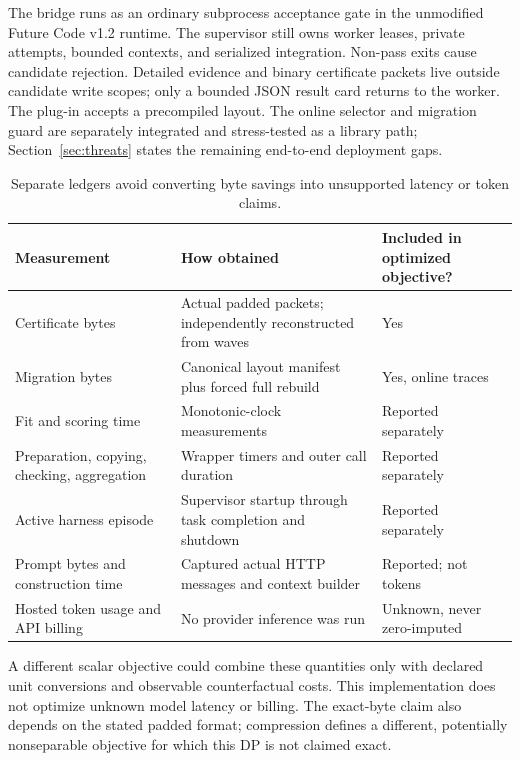 \documentclass[11pt]{article}
\theoremstyle{definition}\newtheorem{definition}[theorem]{Definition}
\begin{document}
The bridge runs as an ordinary subprocess acceptance gate in the unmodified Future Code v1.2 runtime. The supervisor still owns worker leases, private attempts, bounded contexts, and serialized integration. Non-pass exits cause candidate rejection. Detailed evidence and binary certificate packets live outside candidate write scopes; only a bounded JSON result card returns to the worker. The plug-in accepts a precompiled layout. The online selector and migration guard are separately integrated and stress-tested as a library path; Section~\ref{sec:threats} states the remaining end-to-end deployment gaps.

\begin{table}[t]\centering\small
\caption{Separate ledgers avoid converting byte savings into unsupported latency or token claims.}
\begin{tabularx}{\linewidth}{@{}p{.27\linewidth}XX@{}}\toprule
Measurement & How obtained & Included in optimized objective?\\\midrule
Certificate bytes & Actual padded packets; independently reconstructed from waves & Yes\\
Migration bytes & Canonical layout manifest plus forced full rebuild & Yes, online traces\\
Fit and scoring time & Monotonic-clock measurements & Reported separately\\
Preparation, copying, checking, aggregation & Wrapper timers and outer call duration & Reported separately\\
Active harness episode & Supervisor startup through task completion and shutdown & Reported separately\\
Prompt bytes and construction time & Captured actual HTTP messages and context builder & Reported; not tokens\\
Hosted token usage and API billing & No provider inference was run & Unknown, never zero-imputed\\\bottomrule
\end{tabularx}
\end{table}
A different scalar objective could combine these quantities only with declared unit conversions and observable counterfactual costs. This implementation does not optimize unknown model latency or billing. The exact-byte claim also depends on the stated padded format; compression defines a different, potentially nonseparable objective for which this DP is not claimed exact.






\end{document}
